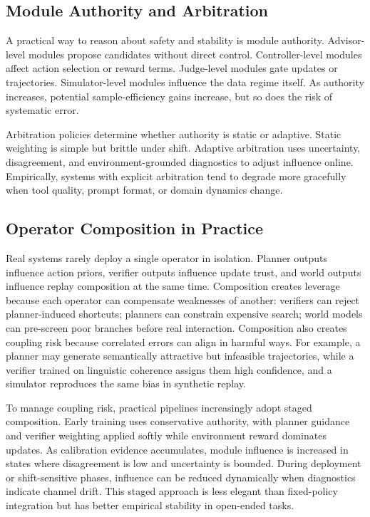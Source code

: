 \documentclass[pdflatex,sn-mathphys-num]{sn-jnl}
\begin{document}
\subsection{Module Authority and Arbitration}
A practical way to reason about safety and stability is module authority. Advisor-level modules propose candidates without direct control. Controller-level modules affect action selection or reward terms. Judge-level modules gate updates or trajectories. Simulator-level modules influence the data regime itself. As authority increases, potential sample-efficiency gains increase, but so does the risk of systematic error.

Arbitration policies determine whether authority is static or adaptive. Static weighting is simple but brittle under shift. Adaptive arbitration uses uncertainty, disagreement, and environment-grounded diagnostics to adjust influence online. Empirically, systems with explicit arbitration tend to degrade more gracefully when tool quality, prompt format, or domain dynamics change.

\subsection{Operator Composition in Practice}
Real systems rarely deploy a single operator in isolation. Planner outputs influence action priors, verifier outputs influence update trust, and world outputs influence replay composition at the same time. Composition creates leverage because each operator can compensate weaknesses of another: verifiers can reject planner-induced shortcuts; planners can constrain expensive search; world models can pre-screen poor branches before real interaction. Composition also creates coupling risk because correlated errors can align in harmful ways. For example, a planner may generate semantically attractive but infeasible trajectories, while a verifier trained on linguistic coherence assigns them high confidence, and a simulator reproduces the same bias in synthetic replay.

To manage coupling risk, practical pipelines increasingly adopt staged composition. Early training uses conservative authority, with planner guidance and verifier weighting applied softly while environment reward dominates updates. As calibration evidence accumulates, module influence is increased in states where disagreement is low and uncertainty is bounded. During deployment or shift-sensitive phases, influence can be reduced dynamically when diagnostics indicate channel drift. This staged approach is less elegant than fixed-policy integration but has better empirical stability in open-ended tasks.
\end{document}

